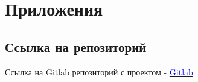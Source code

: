 \section{Приложения}

\subsection{Ссылка на репозиторий}

Ссылка на Gitlab репозиторий с проектом - \href{https://gitlab.com/Ch0p1k3/papams-nft-discord-bot}{\textcolor{blue}{Gitlab}}
